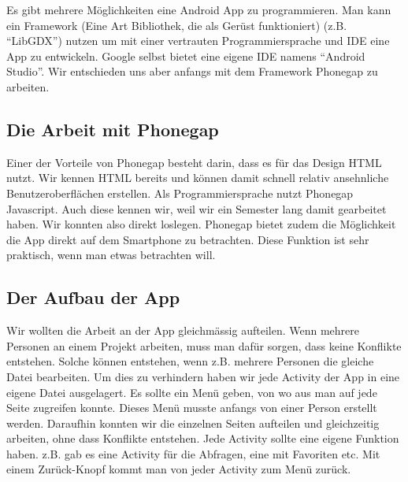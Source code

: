 Es gibt mehrere Möglichkeiten eine Android App zu programmieren. Man kann ein Framework (Eine Art Bibliothek, die als Gerüst funktioniert)  (z.B. "`LibGDX"') nutzen um mit einer vertrauten Programmiersprache und IDE eine App zu entwickeln. Google selbst bietet eine eigene IDE namens "`Android Studio"'. Wir entschieden uns aber anfangs mit dem Framework Phonegap zu arbeiten.


\subsection{Die Arbeit mit Phonegap}
Einer der Vorteile von Phonegap besteht darin, dass es für das Design HTML nutzt. Wir kennen HTML bereits und können damit schnell relativ ansehnliche Benutzeroberflächen erstellen. Als Programmiersprache nutzt Phonegap Javascript. Auch diese kennen wir, weil wir ein Semester lang damit gearbeitet haben. Wir konnten also direkt loslegen. Phonegap bietet zudem die Möglichkeit die App direkt auf dem Smartphone zu betrachten. Diese Funktion ist sehr praktisch, wenn man etwas betrachten will.

\subsection{Der Aufbau der App}
Wir wollten die Arbeit an der App gleichmässig aufteilen. Wenn mehrere Personen an einem Projekt arbeiten, muss man dafür sorgen, dass keine Konflikte entstehen. Solche können entstehen, wenn z.B. mehrere Personen die gleiche Datei bearbeiten. Um dies zu verhindern haben wir jede Activity der App in eine eigene Datei ausgelagert. Es sollte ein Menü geben, von wo aus man auf jede Seite zugreifen konnte. Dieses Menü musste anfangs von einer Person erstellt werden. Daraufhin konnten wir die einzelnen Seiten aufteilen und gleichzeitig arbeiten, ohne dass Konflikte entstehen. Jede Activity sollte eine eigene Funktion haben. z.B. gab es eine Activity für die Abfragen, eine mit Favoriten etc. Mit einem Zurück-Knopf kommt man von jeder Activity zum Menü zurück.

